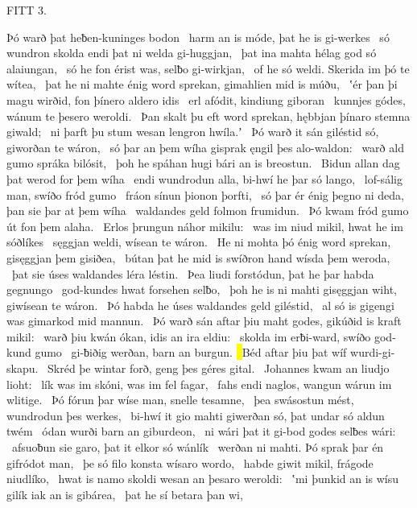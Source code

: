 FITT 3.

Þó warð þat heƀen-kuninges bodon \hld\ harm an is móde,
þat he is gi-werkes \hld\ só wundron skolda
endi þat ni welda gi-huggjan, \hld\ þat ina mahta hélag god
só alaiungan, \hld\ só he fon érist was,
selƀo gi-wirkjan, \hld\ of he só weldi.
Skerida im þó te wítea, \hld\ þat he ni mahte énig word sprekan,
gimahlien mid is múðu, \hld\ ʽér þan þi magu wirðid,
fon þínero aldero idis \hld\ erl afódit,
kindiung giboran \hld\ kunnjes gódes,
wánum te þesero weroldi. \hld\ Þan skalt þu eft word sprekan,
hębbjan þínaro stemna giwald; \hld\ ni þarft þu stum wesan
lengron hwíla.ʼ \hld\ Þó warð it sán giléstid só,
giworðan te wáron, \hld\ só þar an þem wíha gisprak
ęngil þes alo-waldon: \hld\ warð ald gumo
spráka bilósit, \hld\ þoh he spáhan hugi
bári an is breostun. \hld\ Bidun allan dag
þat werod for þem wíha \hld\ endi wundrodun alla,
bi-hwí he þar só lango, \hld\ lof-sálig man,
swíðo fród gumo \hld\ fráon sínun
þionon þorfti, \hld\ só þar ér énig þegno ni deda,
þan sie þar at þem wíha \hld\ waldandes geld
folmon frumidun. \hld\ Þó kwam fród gumo
út fon þem alaha. \hld\ Erlos þrungun
náhor mikilu: \hld\ was im niud mikil,
hwat he im sóðlíkes \hld\ sęggjan weldi,
wísean te wáron. \hld\ He ni mohta þó énig word sprekan,
gisęggjan þem gisiðea, \hld\ bútan þat he mid is swíðron hand
wísda þem weroda, \hld\ þat sie úses waldandes
léra léstin. \hld\ Þea liudi forstódun,
þat he þar habda gegnungo \hld\ god-kundes hwat
forsehen selƀo, \hld\ þoh he is ni mahti gisęggjan wiht,
giwísean te wáron. \hld\ Þó habda he úses waldandes
geld giléstid, \hld\ al só is gigengi was
gimarkod mid mannun. \hld\ Þó warð sán aftar þiu maht godes,
gikúðid is kraft mikil: \hld\ warð þiu kwán ókan,
idis an ira eldiu: \hld\ skolda im erƀi-ward,
swíðo god-kund gumo \hld\ gi-ƀiðig werðan,
barn an burgun. \hl\ Béd aftar þiu
þat wíf wurdi-gi-skapu. \hld\ Skréd þe wintar forð,
geng þes géres gital. \hld\ Johannes kwam
an liudjo lioht: \hld\ lík was im skóni,
was im fel fagar, \hld\ fahs endi naglos,
wangun wárun im wlitige. \hld\ Þó fórun þar wíse man,
snelle tesamne, \hld\ þea swásostun mést,
wundrodun þes werkes, \hld\ bi-hwí it gio mahti giwerðan só,
þat undar só aldun twém \hld\ ódan wurði
barn an giburdeon, \hld\ ni wári þat it gi-bod godes
selƀes wári: \hld\ afsuoƀun sie garo,
þat it elkor só wánlík \hld\ werðan ni mahti.
Þó sprak þar én gifródot man, \hld\ þe só filo konsta
wísaro wordo, \hld\ habde giwit mikil,
frágode niudlíko, \hld\ hwat is namo skoldi
wesan an þesaro weroldi: \hld\ ʽmi þunkid an is wísu gilík
iak an is gibárea, \hld\ þat he sí betara þan wi,
